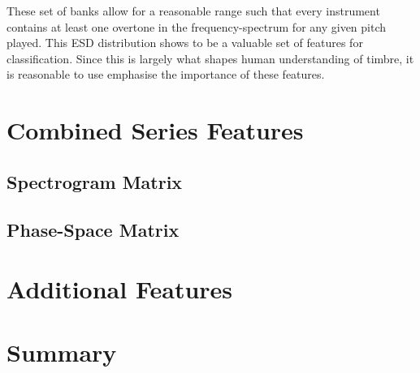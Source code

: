 \documentclass[12pt,letterpaper]{article}
\begin{document}
These set of banks allow for a reasonable range such that every instrument contains at least one overtone in the frequency-spectrum for any given pitch played. This ESD distribution shows to be a valuable set of features for classification. Since this is largely what shapes human understanding of timbre, it is reasonable to use emphasise the importance of these features.




\section{Combined Series Features}


\subsection{Spectrogram Matrix}


\subsection{Phase-Space Matrix}





\section{Additional Features}



\section*{Summary}

\end{document}
